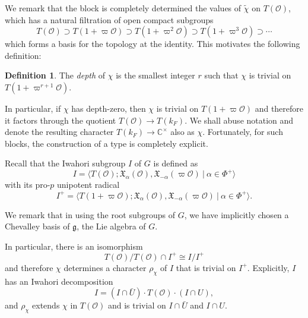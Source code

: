\documentclass{article}
\newcommand{\cO}{\mathcal{O}}
\newcommand{\CC}{\mathbb{C}}
\newcommand{\RR}{\mathbb{R}}
\theoremstyle{plain}
\theoremstyle{definition}
\newtheorem{definition}[theorem]{Definition}
\begin{document}
    We remark that the block is completely determined the values of $\tilde\chi$ on $T(\cO)$, which has a natural filtration of open compact subgroups
    $$T(\cO)\supset T(1+\varpi\cO)\supset T(1+\varpi^2\cO)\supset T(1+\varpi^3\cO)\supset\cdots$$
    which forms a basis for the topology at the identity.
    This motivates the following definition:
    \begin{definition}
        The \textit{depth} of $\chi$ is the smallest integer $r$ such that $\chi$ is trivial on $T(1+\varpi^{r+1}\cO)$.
    \end{definition}
    In particular, if $\chi$ has depth-zero, then $\chi$ is trivial on $T(1+\varpi\cO)$ and therefore it factors through the quotient $T(\cO)\rightarrow T(k_F)$. We shall abuse notation and denote the resulting character $T(k_F)\rightarrow \CC^{\times}$ also as $\chi$. Fortunately, for such blocks, the construction of a type is completely explicit.

    Recall that the Iwahori subgroup $I$ of $G$ is defined as 
    $$I=\langle T(\mathcal{\mathcal{O}}); \mathfrak{X}_\alpha(\mathcal{O}),\mathfrak{X}_{-\alpha}(\varpi\mathcal{O})\ |\ \alpha\in\Phi^+\rangle$$
    with its pro-$p$ unipotent radical
    $$I^+=\langle T(1+\varpi\mathcal{\mathcal{O}}); \mathfrak{X}_\alpha(\mathcal{O}),\mathfrak{X}_{-\alpha}(\varpi\mathcal{O})\ |\ \alpha\in\Phi^+\rangle.$$

    We remark that in using the root subgroups of $G$, we have implicitly chosen a Chevalley basis of $\mathfrak{g}$, the Lie algebra of $G$.


    In particular, there is an isomorphism
    $$T(\cO)/T(\cO)\cap I^+\cong I/I^+$$
    and therefore $\chi$ determines a character $\rho_\chi$ of $I$ that is trivial on $I^+$. Explicitly, $I$ has an Iwahori decomposition $$I=(I\cap\bar U)\cdot T(\cO)\cdot(I\cap U),$$
    and $\rho_\chi$ extends $\chi$ in $T(\cO)$ and is trivial on $I\cap\bar U$ and $I\cap U$.
\end{document}
